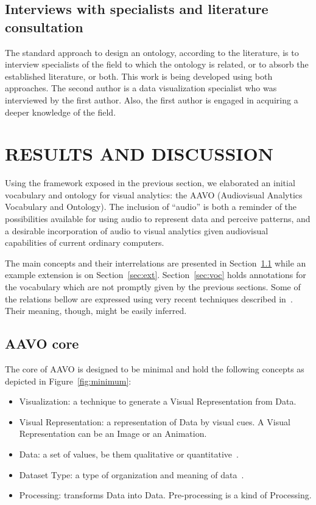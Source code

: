 \documentclass[12pt,fleqn]{article}
\begin{document}
\subsection{Interviews with specialists and literature consultation}
The standard approach to design an ontology, according to the literature,
is to interview specialists of the field to which the ontology is related,
or to absorb the established literature, or both.
This work is being developed using both approaches.
The second author is a data visualization specialist who was
interviewed by the first author.
Also, the first author is engaged in acquiring a deeper knowledge of the field.

\section{RESULTS AND DISCUSSION}\label{sec:res}
Using the framework exposed in the previous section,
we elaborated an initial vocabulary and ontology for
visual analytics: the AAVO (Audiovisual Analytics Vocabulary and Ontology).
The inclusion of ``audio'' is both a reminder of the possibilities
available for using audio to represent data and perceive patterns,
and a desirable incorporation of audio to visual analytics given
audiovisual capabilities of current ordinary computers.

The main concepts and their interrelations are presented in
Section~\ref{sec:core} while an example extension is on Section~\ref{sec:ext}.
Section~\ref{sec:voc} holds annotations for the vocabulary which are not promptly
given by the previous sections.
Some of the relations bellow are expressed using very recent 
techniques described in~\cite{enhance}.
Their meaning, though, might be easily inferred.

\subsection{AAVO core}\label{sec:core}
The core of AAVO is designed to be minimal and hold the following concepts as
depicted in Figure~\ref{fig:minimum}:
\begin{itemize}
	\item Visualization: a technique to generate a Visual Representation from Data.
	\item Visual Representation: a representation of Data by visual cues.
		A Visual Representation can be an Image or an Animation.
	\item Data: a set of values, be them qualitative or quantitative~\citep{wikipData}.
	\item Dataset Type: a type of organization and meaning of data~\citep{munzner}.
	\item Processing: transforms Data into Data. Pre-processing is a kind of Processing.
\end{itemize}
\end{document}

